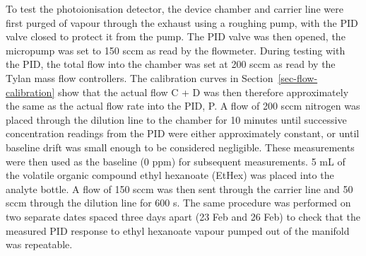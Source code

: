 \documentclass[
  a4paper,
]{scrbook}
\begin{document}
To test the photoionisation detector, the device chamber and carrier
line were first purged of vapour through the exhaust using a roughing
pump, with the PID valve closed to protect it from the pump. The PID
valve was then opened, the micropump was set to 150 sccm as read by the
flowmeter. During testing with the PID, the total flow into the chamber
was set at 200 sccm as read by the Tylan mass flow controllers. The
calibration curves in Section~\ref{sec-flow-calibration} show that the
actual flow C + D was then therefore approximately the same as the
actual flow rate into the PID, P. A flow of 200 sccm nitrogen was placed
through the dilution line to the chamber for 10 minutes until successive
concentration readings from the PID were either approximately constant,
or until baseline drift was small enough to be considered negligible.
These measurements were then used as the baseline (0 ppm) for subsequent
measurements. 5 mL of the volatile organic compound ethyl hexanoate
(EtHex) was placed into the analyte bottle. A flow of 150 sccm was then
sent through the carrier line and 50 sccm through the dilution line for
600 s. The same procedure was performed on two separate dates spaced
three days apart (23 Feb and 26 Feb) to check that the measured PID
response to ethyl hexanoate vapour pumped out of the manifold was
repeatable.
\end{document}
